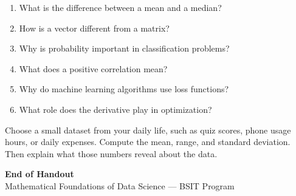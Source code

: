 \documentclass[11pt,a4paper]{article}
\begin{document}
\begin{enumerate}[leftmargin=*]
  \item What is the difference between a mean and a median?
  \item How is a vector different from a matrix?
  \item Why is probability important in classification problems?
  \item What does a positive correlation mean?
  \item Why do machine learning algorithms use loss functions?
  \item What role does the derivative play in optimization?
\end{enumerate}

\begin{examplebox}
Choose a small dataset from your daily life, such as quiz scores, phone usage hours, or daily expenses. Compute the mean, range, and standard deviation. Then explain what those numbers reveal about the data.
\end{examplebox}

\vfill
\begin{center}
{\large\textcolor{primary}{\textbf{End of Handout}}}\\[4pt]
{\small\textcolor{gray!70!black}{Mathematical Foundations of Data Science --- BSIT Program}}
\end{center}
\end{document}
